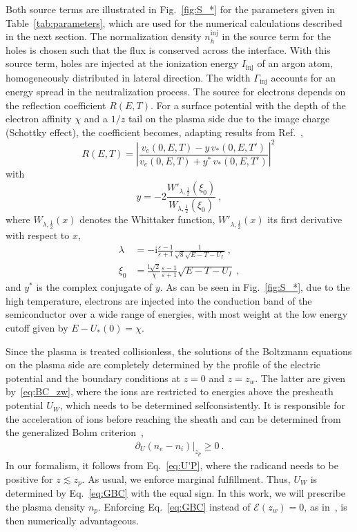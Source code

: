 \documentclass[pre,reprint,floats]{revtex4-1}
\newcommand{\rmi}{\ensuremath{\mathrm{i}}}
\begin{document}
Both source terms are illustrated in Fig.~\ref{fig:S_*} for the parameters given in Table~\ref{tab:parameters},
which are used for the numerical calculations described in the next section. The normalization density 
$n_h^\textrm{inj}$ in the source term for the holes is chosen such that the flux is conserved across  
the interface. With this source term, holes are injected at the ionization energy $I_\textrm{inj}$ of an 
argon atom, homogeneously distributed in lateral direction. The width $\Gamma_\textrm{inj}$ accounts for 
an energy spread in the neutralization process. The source for electrons depends on the reflection 
coefficient $R(E,T)$. For a surface potential with the depth of the electron affinity $\chi$ and 
a $1/z$ tail on the plasma side due to the image charge (Schottky effect), the coefficient becomes, 
adapting results from Ref.~\cite{MacColl39}, 
\begin{equation}\label{eq:R}
R(E,T) =  \left|\frac{v_e(0,E,T)- y\,v_*(0,E,T')}{v_e(0,E,T)+ y^*\,v_*(0,E,T')}\right|^2~ 
\end{equation}
with 
\begin{equation}
y = -2\frac{W'_{\lambda,\frac{1}{2}}(\xi_0)}{W_{\lambda,\frac{1}{2}}(\xi_0)}~,
\end{equation}
where $W_{\lambda,\frac{1}{2}}(x)$ denotes the Whittaker function, $W'_{\lambda,\frac{1}{2}}(x)$ its first 
derivative with respect to $x$, 
\begin{align}
\lambda &= -\rmi \frac{\varepsilon -1}{\varepsilon+1}\frac{1}{\sqrt{8}\sqrt{E-T-U_I}}~,\\
\xi_0 &= \frac{\rmi \sqrt{2}}{\chi}\frac{\varepsilon -1}{\varepsilon+1} \sqrt{E-T-U_I}~,
\end{align}
and $y^*$ is the complex conjugate of $y$. As can be seen in Fig.~\ref{fig:S_*}, due to the high 
temperature, electrons are injected into the conduction band of the semiconductor over a wide range of 
energies, with most weight at the low energy cutoff given by $E-U_*(0)=\chi$.  
	
Since the plasma is treated collisionless, the solutions of the Boltzmann equations on the plasma side
are completely determined by the profile of the electric potential and the boundary conditions at $z=0$ 
and $z=z_w$. The latter are given by~\eqref{eq:BC_zw}, where the ions are restricted to energies above 
the presheath potential $U_W$, which needs to be determined selfconsistently. It is responsible for the 
acceleration of ions before reaching the sheath and can be determined from the generalized Bohm  
criterion~\cite{Riemann91},
\begin{align}\label{eq:GBC}
\partial_U(n_e-n_i)|_{z_p}\geq 0~.
\end{align}
In our formalism, it follows from Eq.~\eqref{eq:U'P}, where the radicand needs to be positive for 
$z \lesssim z_p$. As usual, we enforce marginal fulfillment. Thus, $U_W$ is determined by Eq.~\eqref{eq:GBC}
with the equal sign. In this work, we will prescribe the plasma density $n_p$. Enforcing Eq.~\eqref{eq:GBC} 
instead of $\mathcal{E}(z_w)=0$, as in~\cite{RBF20}, is then numerically advantageous. 
\end{document}

